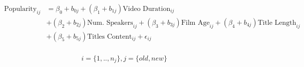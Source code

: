 \begin{align}
\begin{split}
\text{Popularity}_{ij}&=\beta_0+b_{0j}+(\beta_1+b_{1j})\text{Video Duration}_{ij}\\
&+(\beta_2+b_{2j})\text{Num. Speakers}_{ij}+(\beta_3+b_{3j})\text{Film Age}_{ij}+(\beta_4+b_{4j})\text{Title Length}_{ij}\\
&+(\beta_5+b_{5j})\text{Titles Content}_{ij}+\epsilon_{ij}\\
\end{split}
\label{linear_mixed_times_eqn}
\end{align}

\begin{equation*}
i=\{1,..,n_j\}, j=\{old, new\}
\end{equation*}